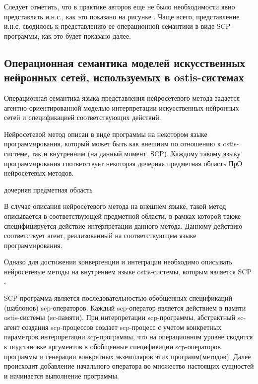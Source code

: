 Следует отметить, что в практике авторов еще не было необходимости явно представлять и.н.с., как это показано на рисунке . Чаще всего, представление и.н.с. сводилось к представлению ее операционной семантики в виде SCP-программы, как это будет показано далее.

\subsection{Операционная семантика моделей искусственных нейронных сетей, используемых в ostis-системах}

Операционная семантика языка представления нейросетевого метода задается агентно-ориентированной моделью интерпретации искусственных нейронных сетей и спецификацией соответствующих действий.

Нейросетевой метод описан в виде программы на некотором языке программирования, который может быть как внешним по отношению к ostis-системе, так и внутренним (на данный момент, SCP). Каждому такому языку программирования соответствует некоторая дочерняя предметная область ПрО нейросетевых методов.

\begin{SCn}
	\begin{scnrelfromset}{дочерняя предметная область}
	\end{scnrelfromset}
\end{SCn}

В случае описания нейросетевого метода на внешнем языке, такой метод описывается в соответствующей предметной области, в рамках которой также специфицируется действие интерпретации данного метода. Данному действию соответствует агент, реализованный на соответствующем языке программирования.

Однако для достижения конвергенции и интеграции необходимо описывать нейросетевые методы на внутреннем языке ostis-системы, которым является SCP .

SCP-программа является последовательностью обобщенных спецификаций (шаблонов) scp-операторов. Каждый scp-оператор является действием в памяти ostis-системы (sc-памяти). При интерпретации scp-программы, абстрактный sc-агент создания scp-процессов создает scp-процесс с учетом конкретных параметров интерпретации scp-программы, что на операционном уровне сводится к подстановке аргументов в обобщенные спецификации scp-операторов программы и генерации конкретных экземпляров этих программ(методов). Далее происходит добавление начального оператора во множество настоящих сущностей и начинается выполнение программы.

